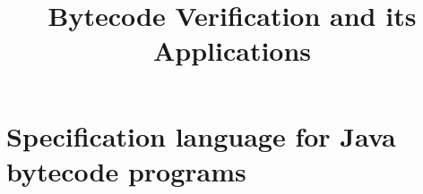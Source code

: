 \documentclass[book,10pt]{book}
\title{Bytecode Verification and its Applications}
\begin{document}
\renewcommand{\topfraction}{0.9}
\renewcommand{\textfraction}{0.05}
\renewcommand{\floatpagefraction}{0.75}

\maketitle
\tableofcontents

\chapter{Specification language for Java bytecode programs} \label{bcsl}
   
  
  
  
  
  


\end{document}
